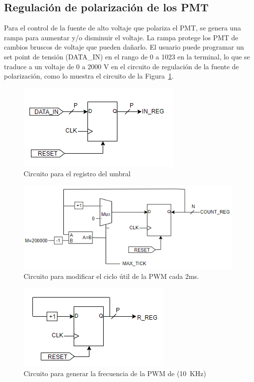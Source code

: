 \subsection{Regulación de  polarización de los PMT}
\label{A100}
Para el control de la fuente de alto voltaje que polariza el PMT, se genera una rampa para aumentar y/o disminuir el voltaje. 
La rampa protege los PMT de cambios bruscos de voltaje que pueden dañarlo. El usuario puede programar un set point de tensión (DATA\_IN) en el rango de 0 a 1023 en la terminal, lo que se traduce a un voltaje de 0 a 2000 V en el circuito de regulación de la fuente de polarización, como lo muestra el circuito de la Figura~\ref{registro}.

\begin{figure}[H]
\includegraphics[scale=1]{Figs/rampa3.PNG} 
\centering
\caption{Circuito para el registro del umbral}
\label{registro}
\end{figure}

\begin{figure}[H]
\includegraphics[scale=1]{Figs/rampa4.PNG} 
\centering
\caption{Circuito para modificar el ciclo útil de la PWM cada 2ms.}
\label{cicloutil}
\end{figure}

\begin{figure}[H]
\includegraphics[scale=1]{Figs/RAMPA1.PNG} 
\centering
\caption{Circuito para generar la frecuencia de la PWM de (10~KHz)}
\label{frecuencia}
\end{figure}

